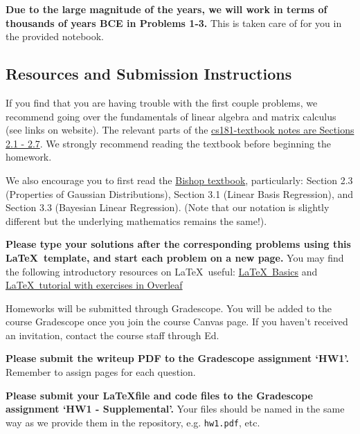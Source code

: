 \documentclass[submit]{harvardml}
\begin{document}
\textbf{Due to the large magnitude of the years, we will work in terms
  of thousands of years BCE in Problems 1-3.} This is taken care of
for you in the provided notebook.






\subsection*{Resources and Submission Instructions}
If you find that you are having trouble with the first couple
problems, we recommend going over the fundamentals of linear algebra
and matrix calculus (see links on website).  The relevant parts of the
\href{https://github.com/harvard-ml-courses/cs181-textbook/blob/master/Textbook.pdf}{cs181-textbook
  notes are Sections 2.1 - 2.7}.  We strongly recommend reading the
textbook before beginning the homework.

We also encourage you to first read the
\href{http://users.isr.ist.utl.pt/~wurmd/Livros/school/Bishop\%20-\%20Pattern\%20Recognition\%20And\%20Machine\%20Learning\%20-\%20Springer\%20\%202006.pdf}{Bishop
  textbook}, particularly: Section 2.3 (Properties of Gaussian
Distributions), Section 3.1 (Linear Basis Regression), and Section 3.3
(Bayesian Linear Regression). (Note that our notation is slightly
different but the underlying mathematics remains the same!).

\textbf{Please type your solutions after the corresponding problems
  using this \LaTeX\ template, and start each problem on a new page.}
You may find the following introductory resources on \LaTeX\ useful:
\href{http://www.mjdenny.com/workshops/LaTeX_Intro.pdf}{\LaTeX\ Basics}
and
\href{https://www.overleaf.com/learn/latex/Free_online_introduction_to_LaTeX_(part_1)}{\LaTeX\ tutorial
  with exercises in Overleaf}

Homeworks will be submitted through Gradescope. You will be added to
the course Gradescope once you join the course Canvas page. If you
haven't received an invitation, contact the course staff through Ed.

\textbf{Please submit the writeup PDF to the Gradescope assignment
  `HW1'.} Remember to assign pages for each question.

\textbf{Please submit your \LaTeX file and code files to the
  Gradescope assignment `HW1 - Supplemental'.} Your files should be
named in the same way as we provide them in the repository,
e.g. \texttt{hw1.pdf}, etc.


\newpage
\end{document}
